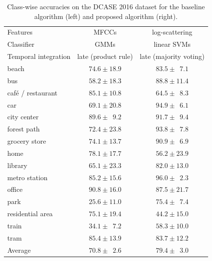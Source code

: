 \documentclass[journal]{IEEEtran}
\begin{document}
\begin{table}
\begin{center}
\caption{Class-wise accuracies on the DCASE 2016 dataset for the baseline algorithm (left) and proposed algorithm (right).}
\begin{tabular}{lcc}
Features & MFCCs & log-scattering \\
Classifier  & GMMs    & linear SVMs \\
Temporal integration & late (product rule) & late (majority voting) \\
\midrule
beach & $74.6 \pm 18.9$ & $83.5 \pm \phantom{0}7.1$ \\
bus & $58.2 \pm 18.3$ & $88.8 \pm 11.4$ \\
caf\'{e} / restaurant & $85.1 \pm 10.8$ & $64.5 \pm \phantom{0}8.3$ \\
car & $69.1 \pm 20.8$ & $94.9 \pm \phantom{0}6.1$ \\
city center & $89.6 \pm \phantom{0}9.2$ & $91.7 \pm \phantom{0}9.4$ \\
forest path & $72.4 \pm 23.8$ & $93.8 \pm \phantom{0}7.8$ \\
grocery store & $74.1 \pm 13.7$ & $90.9 \pm \phantom{0}6.9$ \\
home & $78.1 \pm 17.7$ & $56.2 \pm 23.9$ \\
library & $65.1 \pm 23.3$ & $82.0 \pm 13.0$ \\
metro station & $85.2 \pm 15.6$ & $96.0 \pm \phantom{0}2.3$ \\
office & $90.8 \pm 16.0$ & $87.5 \pm 21.7$ \\
park & $25.6 \pm 11.0$ & $75.4 \pm \phantom{0}7.4$ \\
residential area & $75.1 \pm 19.4$ & $44.2 \pm 15.0$ \\
train & $34.1 \pm \phantom{0}7.2$ & $58.3 \pm 10.0$ \\
tram & $85.4 \pm 13.9$ & $83.7 \pm 12.2$ \\
\bottomrule
Average & $70.8 \pm \phantom{0}2.6$ & $79.4 \pm \phantom{0}3.0$
\end{tabular}
\end{center}
\label{table:dcase2016}
\end{table}
\end{document}
